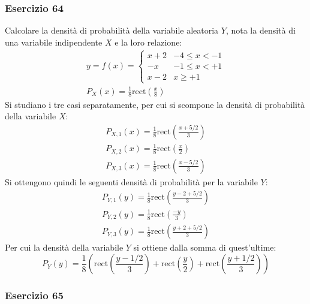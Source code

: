 \documentclass{article}
\newcommand{\rect}{\mathrm{rect}}
\begin{document}
\subsubsection*{Esercizio 64}

Calcolare la densità di probabilità della variabile aleatoria $Y$, nota la densità di una variabile indipendente $X$ e la loro relazione:
\begin{gather*}
    y=f(x)=\begin{cases}
        x+2&-4\leq x<-1\\
        -x&-1\leq x<+1\\
        x-2&x\geq +1
    \end{cases}\\
    P_X(x)=\displaystyle\frac{1}{8}\rect\left(\frac{x}{8}\right)
\end{gather*}
Si studiano i tre casi separatamente, per cui si scompone la densità di probabilità della variabile $X$:
\begin{gather*}
    P_{X,1}(x)=\displaystyle\frac{1}{8}\rect\left(\frac{x+5/2}{3}\right)\\
    P_{X,2}(x)=\displaystyle\frac{1}{8}\rect\left(\frac{x}{2}\right)\\
    P_{X,3}(x)=\displaystyle\frac{1}{8}\rect\left(\frac{x-5/2}{3}\right)
\end{gather*}
Si ottengono quindi le seguenti densità di probabilità per la variabile $Y$:
\begin{gather*}
    P_{Y,1}(y)=\displaystyle\frac{1}{8}\rect\left(\frac{y-2+5/2}{3}\right)\\
    P_{Y,2}(y)=\displaystyle\frac{1}{8}\rect\left(\frac{-y}{3}\right)\\
    P_{Y,3}(y)=\displaystyle\frac{1}{8}\rect\left(\frac{y+2+5/2}{3}\right)
\end{gather*}
Per cui la densità della variabile $Y$ si ottiene dalla somma di quest'ultime:
\begin{equation}
    P_Y(y)=\displaystyle\frac{1}{8}\left(\rect\left(\frac{y-1/2}{3}\right)+\rect\left(\frac{y}{2}\right)+\rect\left(\frac{y+1/2}{3}\right)\right)
\end{equation}

\subsubsection*{Esercizio 65}
\end{document}
